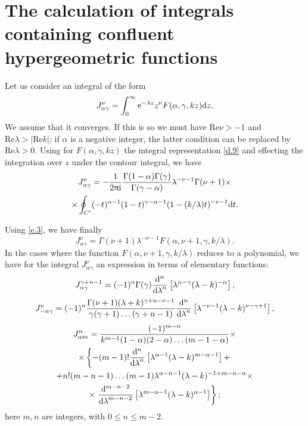 \section{The calculation of integrals containing confluent hypergeometric functions}\label{The calculation of integrals containing confluent hypergeometric functions}
Let us consider an integral of the form
\begin{equation}\label{f.1}
J_{\alpha\gamma}^\nu=\int_{0}^{\infty}\mathrm{e}^{-\lambda z}z^\nu F(\alpha,\gamma,kz)\mathrm{d} z.
\end{equation}
We assume that it converges. If this is so we must have $ \mathrm{Re} \nu > -1 $ and $ \mathrm{Re}\lambda >| \mathrm{Re} k| $; if $\alpha$ is a negative integer, the latter condition can be replaced by $ \mathrm{Re}\lambda >0$. Using for $ F (\alpha, \gamma, kz) $ the integral representation \eqref{d.9} and effecting the integration over $ z $ under the contour integral, we have
\begin{multline*}
J_{\alpha\gamma}^\nu=-\frac{1}{2\uppi\mathrm{i}}\frac{\Gamma(1-\alpha)\Gamma(\gamma)}{\Gamma(\gamma-\alpha)}\lambda^{-\nu-1}\Gamma(\nu+1)\times\\
\times\oint_{C'}(-t)^{\alpha-1}(1-t)^{\gamma-\alpha-1}(1-(k/\lambda)t)^{-\nu-1}\mathrm{d} t.
\end{multline*}



Using \eqref{e.3}, we have finally
\begin{equation}\label{f.2}
J_{\alpha\gamma}^\nu=\Gamma(\nu+1)\lambda^{-\nu-1}F(\alpha,\nu+1,\gamma,k/\lambda).
\end{equation}
In the cases where the function $ F (\alpha, \nu + 1, \gamma, k/\lambda) $ reduces to a polynomial, we have for the integral $ J_{\alpha\gamma}^\nu $ an expression in terms of elementary functions:
\begin{equation}\label{f.3}
J_{\alpha\gamma}^{\gamma+n-1}=(-1)^n\Gamma(\gamma)\frac{\mathrm{d}^n}{{\mathrm{d}\lambda}^n}\left[\lambda^{\alpha-\gamma}(\lambda-k)^{-\alpha} \right],
\end{equation}
\begin{equation}\label{f.4}
J_{-n\gamma}^\nu=(-1)^n\frac{\Gamma(\nu+1)(\lambda+k)^{\gamma+n-\nu-1}}{\gamma(\gamma+1)\dots(\gamma+n-1)}\frac{\mathrm{d}^n}{{\mathrm{d}\lambda}^n}\left[\lambda^{-\nu-1}(\lambda-k)^{\nu-\gamma+1} \right],
\end{equation}
\begin{multline}\label{f.5}
J_{\alpha m}^n=\frac{(-1)^{m-n}}{k^{m-1}(1-\alpha)(2-\alpha)\dots(m-1-\alpha)}\times\\
\times\left\{-(m-1)!\frac{\mathrm{d}^n}{{\mathrm{d}\lambda}^n}\left[\lambda^{\alpha-1}(\lambda-k)^{m-\alpha-1} \right]+\right.\\
+n!(m-n-1)\dots(m-1)\lambda^{\alpha-n-1}(\lambda-k)^{-1+m-n-\alpha}\times\\
\times\left.\frac{\mathrm{d}^{m-n-2}}{{\mathrm{d}\lambda}^{m-n-2}}\left[\lambda^{m-\alpha-1}(\lambda-k)^{\alpha-1} \right]\right\};
\end{multline}
here $ m, n $ are integers, with $ 0 \leqslant n \leqslant m - 2 $.

